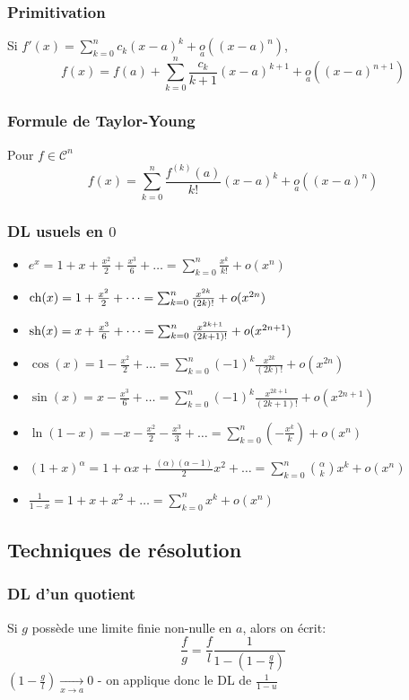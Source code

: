 \documentclass[openany]{book}
\begin{document}
\subsubsection{Primitivation}
Si $f'(x) = \sum_{k=0}^{n} c_k (x-a)^k + \underset{a}{o} ((x-a)^n)$, 
\[ f(x) = f(a) + \sum_{k=0}^{n} \frac{c_k}{k+1}(x-a)^{k+1} + \underset{a}{o}((x-a)^{n+1}) \]

\subsubsection{Formule de Taylor-Young}
Pour $f \in \mathcal{C}^{n}$
\[ f(x) = \sum_{k=0}^{n} \frac{f^{(k)}(a)}{k!} (x-a)^k + \underset{a}{o} ((x-a)^n) \]

\subsubsection{DL usuels en $0$}
\begin{itemize}
    \item $e^x = 1 + x + \frac{x^2}{2} + \frac{x^3}{6} + \dots = \sum_{k=0}^{n}\frac{x^k}{k!} + o(x^n)$
    \item $\text{ch} (x) = 1 + \frac{x^2}{2} + \dots = \sum_{k=0}^{n}\frac{x^{2k}}{(2k)!} + o(x^{2n})$
    \item $\text{sh} (x) = x + \frac{x^3}{6} + \dots = \sum_{k=0}^{n}\frac{x^{2k+1}}{(2k+1)!} + o(x^{2n+1})$
    \item $\cos (x) = 1 - \frac{x^2}{2} + \dots = \sum_{k=0}^{n} (-1)^k \frac{x^{2k}}{(2k)!} + o(x^{2n})$
    \item $\sin (x) = x - \frac{x^3}{6} + \dots = \sum_{k=0}^{n} (-1)^k \frac{x^{2k+1}}{(2k+1)!} + o(x^{2n+1})$
    \item $\ln (1 - x) = - x - \frac{x^2}{2} - \frac{x^3}{3} + \dots = \sum_{k=0}^{n} (-\frac{x^k}{k}) + o(x^n)$
    \item $(1+x)^\alpha = 1 + \alpha x + \frac{(\alpha)(\alpha - 1)}{2}x^2 + \dots = \sum_{k=0}^{n}\binom{\alpha}{k} x^k + o(x^n)$
    \item $\frac{1}{1-x} = 1 + x + x^2 + \dots = \sum_{k=0}^{n} x^k + o(x^n)$
\end{itemize}

\subsection{Techniques de résolution}
\subsubsection{DL d'un quotient}
Si $g$ possède une limite finie non-nulle en $a$, alors on écrit:
\[ \frac{f}{g} = \frac{f}{l} \frac{1}{1-(1-\frac{g}{l})} \]
\noindent $(1-\frac{g}{l}) \underset{x \rightarrow a} \longrightarrow 0$ - on applique donc le DL de $\frac{1}{1-u}$
\end{document}

